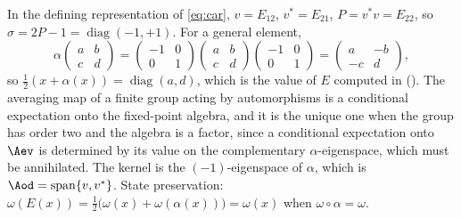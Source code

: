 In the defining representation of \eqref{eq:car}, $v = E_{12}$, $v^{*} = E_{21}$, $P = v^{*}v = E_{22}$, so $\sigma = 2P - 1 = \operatorname{diag}(-1, +1)$. For a general element,
\[
\alpha\begin{pmatrix} a & b \\ c & d \end{pmatrix}
= \begin{pmatrix} -1 & 0 \\ 0 & 1\end{pmatrix}\begin{pmatrix} a & b \\ c & d \end{pmatrix}\begin{pmatrix} -1 & 0 \\ 0 & 1\end{pmatrix}
= \begin{pmatrix} a & -b \\ -c & d \end{pmatrix},
\]
so $\tfrac12(x + \alpha(x)) = \operatorname{diag}(a,d)$, which is the value of $E$ computed in \cite[Prop.~5.5]{ButlerT5} (). The averaging map of a finite group acting by automorphisms is a conditional expectation onto the fixed-point algebra, and it is the unique one when the group has order two and the algebra is a factor, since a conditional expectation onto $\Aev$ is determined by its value on the complementary $\alpha$-eigenspace, which must be annihilated. The kernel is the $(-1)$-eigenspace of $\alpha$, which is $\Aod = \operatorname{span}\{v, v^{*}\}$. State preservation: $\omega(E(x)) = \tfrac12\bigl(\omega(x) + \omega(\alpha(x))\bigr) = \omega(x)$ when $\omega \circ \alpha = \omega$.
